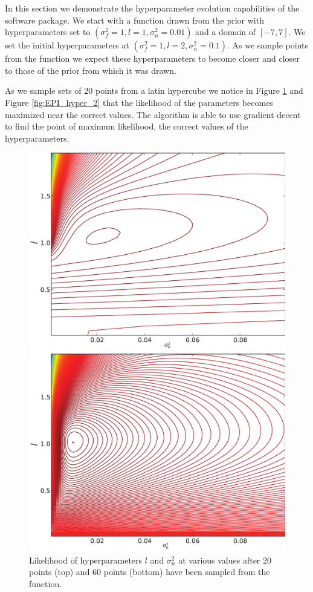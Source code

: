 \documentclass[phd,tocprelim]{cornell}
\begin{document}
In this section we demonstrate the hyperparameter evolution capabilities of the software package. We start with a function drawn from the prior with hyperparameters set to $(\sigma_{f}^{2} = 1, l = 1, \sigma_{n}^{2} = 0.01)$ and a domain of $[-7,7]$. We set the initial hyperparameters at $(\sigma_{f}^{2} = 1, l = 2, \sigma_{n}^{2} = 0.1)$. As we sample points from the function we expect these hyperparameters to become closer and closer to those of the prior from which it was drawn.

As we sample sets of 20 points from a latin hypercube we notice in Figure \ref{fig:EPI_hyper_1} and Figure \ref{fig:EPI_hyper_2} that the likelihood of the parameters becomes maximized near the correct values. The algorithm is able to use gradient decent to find the point of maximum likelihood, the correct values of the hyperparameters.

\begin{figure}[hpt]
 	\centerline{\includegraphics[width=.85\textwidth]{figures/EPI/hyper_update_loglike_20s.pdf}}
    \centerline{\includegraphics[width=.85\textwidth]{figures/EPI/hyper_update_loglike_60s.pdf}}
    \caption[Likelihood of hyperparameters]{Likelihood of hyperparameters $l$ and $\sigma_{n}^{2}$ at various values after 20 points (top) and 60 points (bottom) have been sampled from the function.}
 	\label{fig:EPI_hyper_1}
\end{figure}
\end{document}
